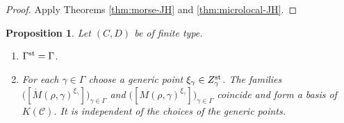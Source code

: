\documentclass[11pt,reqno]{amsart}
\newtheorem{Proposition}[Theorem]{Proposition}
\theoremstyle{definition}
\theoremstyle{remark}
\begin{document}
\begin{proof}
Apply Theorems \ref{thm:morse-JH} and \ref{thm:microlocal-JH}.
\end{proof}



\begin{Proposition}\label{prop:microlocal-basis}
Let $(C,D)$ be of finite type. 
\begin{enumerate}[label=$\mathrm{(\alph*)}$,leftmargin=8mm]
\item $\Gamma^{\rm st}=\Gamma$.
\item For each $\gamma\in\Gamma$ choose a generic point
$\xi_\gamma\in Z_\gamma^{\rm st}$. The families
$\bigl([\mathring M(\rho,\gamma)^{\xi_\gamma}]\bigr)_{\gamma\in\Gamma}$
and
$\bigl([M(\rho,\gamma)^{\xi_\gamma}]\bigr)_{\gamma\in\Gamma}$
coincide and form a basis of  $K(\mathscr C)$.
It  is independent of the choices of the generic points.
\end{enumerate}
\end{Proposition}
\end{document}
